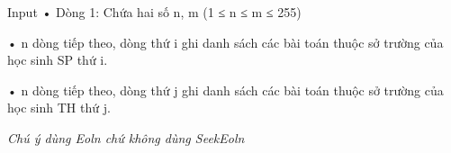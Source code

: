 Input
• Dòng 1: Chứa hai số n, m (1 ≤ n ≤ m ≤ 255)   


   • n dòng tiếp theo, dòng thứ i ghi danh sách các bài toán thuộc sở trường của học sinh SP thứ i.   


   • n dòng tiếp theo, dòng thứ j ghi danh sách các bài toán thuộc sở trường của học sinh TH thứ j.   


\textit{    Chú ý dùng         Eoln        chứ không dùng         SeekEoln       }